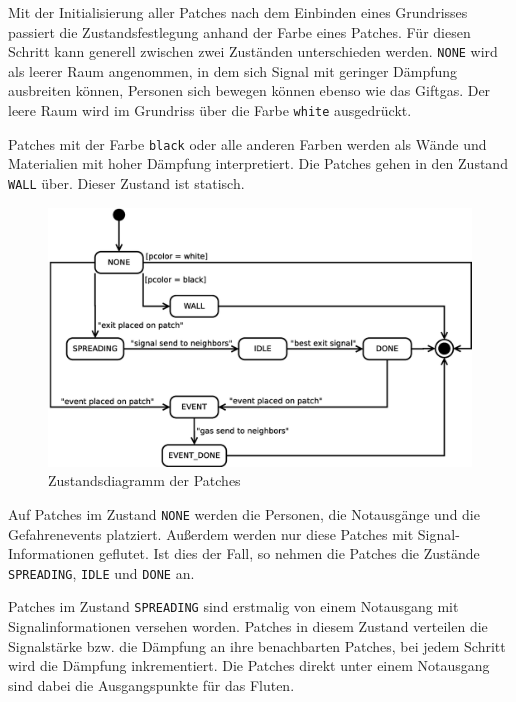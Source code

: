 


Mit der Initialisierung aller Patches nach dem Einbinden eines Grundrisses passiert die Zustandsfestlegung anhand der Farbe eines Patches. Für diesen Schritt kann generell zwischen zwei Zuständen unterschieden werden. \verb|NONE| wird als leerer Raum angenommen, in dem sich Signal mit geringer Dämpfung ausbreiten können, Personen sich bewegen können ebenso wie das Giftgas. Der leere Raum wird im Grundriss über die Farbe \verb|white| ausgedrückt.

Patches mit der Farbe \verb|black| oder alle anderen Farben werden als Wände und Materialien mit hoher Dämpfung interpretiert. Die Patches gehen in den Zustand \verb|WALL| über. Dieser Zustand ist statisch.

\begin{figure}[!ht]
\centering
\includegraphics[height=0.6\textwidth]{simulationsumgebung/patch.eps}
\caption{Zustandsdiagramm der Patches}
\label{fig:patch}
\end{figure}

Auf Patches im Zustand \verb|NONE| werden die Personen, die Notausgänge und die Gefahrenevents platziert. Außerdem werden nur diese Patches mit Signal-Informationen geflutet. Ist dies der Fall, so nehmen die Patches die Zustände \verb|SPREADING|, \verb|IDLE| und \verb|DONE| an.

Patches im Zustand \verb|SPREADING| sind erstmalig von einem Notausgang mit Signalinformationen versehen worden. Patches in diesem Zustand verteilen die Signalstärke bzw. die Dämpfung an ihre benachbarten Patches, bei jedem Schritt wird die Dämpfung inkrementiert. Die Patches direkt unter einem Notausgang sind dabei die Ausgangspunkte für das Fluten.

